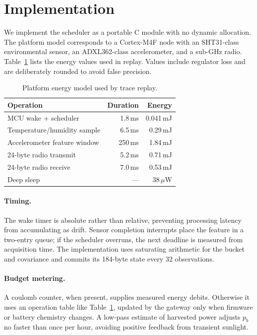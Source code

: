 \section{Implementation}
\label{sec:implementation}

We implement the scheduler as a portable C module with no dynamic allocation.
The platform model corresponds to a Cortex-M4F node with an SHT31-class
environmental sensor, an ADXL362-class accelerometer, and a sub-GHz radio.
Table~\ref{tab:platform} lists the energy values used in replay.  Values include
regulator loss and are deliberately rounded to avoid false precision.

\begin{table}[t]
  \caption{Platform energy model used by trace replay.}
  \label{tab:platform}
  \centering
  \small
  \begin{tabular}{@{}lrr@{}}
    \toprule
    Operation & Duration & Energy \\
    \midrule
    MCU wake + scheduler & 1.8\,ms & 0.041\,mJ \\
    Temperature/humidity sample & 6.5\,ms & 0.29\,mJ \\
    Accelerometer feature window & 250\,ms & 1.84\,mJ \\
    24-byte radio transmit & 5.2\,ms & 0.71\,mJ \\
    24-byte radio receive & 7.0\,ms & 0.53\,mJ \\
    Deep sleep & --- & 38\,$\mu$W \\
    \bottomrule
  \end{tabular}
\end{table}

\paragraph{Timing.}
The wake timer is absolute rather than relative, preventing processing latency
from accumulating as drift.  Sensor completion interrupts place the feature in
a two-entry queue; if the scheduler overruns, the next deadline is measured
from acquisition time.  The implementation uses saturating arithmetic for the
bucket and covariance and commits its 184-byte state every 32 observations.

\paragraph{Budget metering.}
A coulomb counter, when present, supplies measured energy debits.  Otherwise
it uses an operation table like Table~\ref{tab:platform}, updated by the gateway
only when firmware or battery chemistry changes.  A low-pass estimate of
harvested power adjusts $p_b$ no faster than once per hour, avoiding positive
feedback from transient sunlight.

